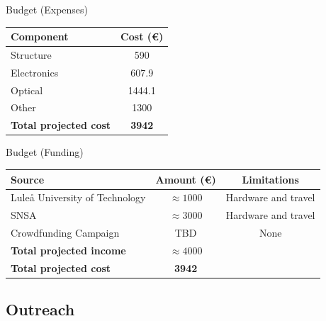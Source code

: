 \documentclass[11pt, aspectratio=169]{beamer}
\begin{document}
\begin{frame}[c]{Budget (Expenses)}
    \centering
    \begin{tabular}{|l|c|} 
        \hline
        Component &  Cost (\euro)  \\ 
        \hline
        Structure & 590  \\
        Electronics & 607.9  \\
        
        Optical & 1444.1  \\
        
        Other & 1300  \\
        \hline
        \textbf{Total projected cost} & \textbf{3942}  \\
        \hline
    \end{tabular}
\end{frame}

\begin{frame}[c]{Budget (Funding)}
    \centering
    \small
    \begin{tabular}{|l|c|c|} 
        \hline
        Source & Amount (\euro) & Limitations   \\ 
        \hline
        Luleå University of Technology & $\approx1000$ & Hardware and travel \\
        SNSA & $\approx3000$ & Hardware and travel \\
        Crowdfunding Campaign & TBD & None \\
        \hline
        \textbf{Total projected income} & \textbf{$\approx4000$} & \\
        \hline
        \bf{Total projected cost} & \bf{3942} & \\
        \hline
    \end{tabular}
\end{frame}
    
\subsection{Outreach}
\end{document}
